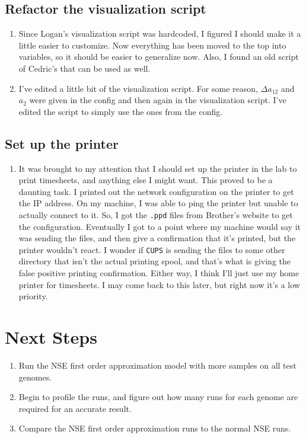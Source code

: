\documentclass[12 pt]{article}
\begin{document}
 		\subsection{Refactor the visualization script}
 		\begin{enumerate}
 			\item Since Logan's visualization script was hardcoded, I figured I should make it a little easier to customize. Now everything has been moved to the top into variables, so it should be easier to generalize now. Also, I found an old script of Cedric's that can be used as well.
 			\item I've edited a little bit of the visualization script. For some reason, $ \Delta a_{12} $ and $ a_2 $ were given in the config and then again in the visualization script. I've edited the script to simply use the ones from the config.
 		\end{enumerate}
 			
 		\subsection{Set up the printer}
 		\begin{enumerate}
		 	\item It was brought to my attention that I should set up the printer in the lab to print timesheets, and anything else I might want. This proved to be a daunting task. I printed out the network configuration on the printer to get the IP address. On my machine, I was able to ping the printer but unable to actually connect to it. So, I got the \texttt{.ppd} files from Brother's website to get the configuration. Eventually I got to a point where my machine would say it was sending the files, and then give a confirmation that it's printed, but the printer wouldn't react. I wonder if \texttt{CUPS} is sending the files to some other directory that isn't the actual printing spool, and that's what is giving the false positive printing confirmation. Either way, I think I'll just use my home printer for timesheets. I may come back to this later, but right now it's a low priority.
 		\end{enumerate}
 		
 		\section{Next Steps}
	 		\begin{enumerate}
	 			\item Run the NSE first order approximation model with more samples on all test genomes.
	 			\item Begin to profile the runs, and figure out how many runs for each genome are required for an accurate result.
	 			\item Compare the NSE first order approximation runs to the normal NSE runs.
	 		\end{enumerate}
\end{document}
